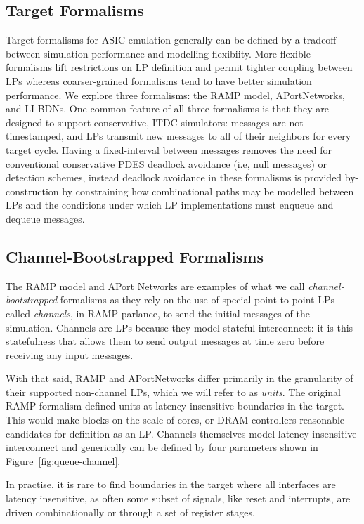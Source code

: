 \subsection{Target Formalisms}

Target formalisms for ASIC emulation generally can be defined by a tradeoff
between simulation performance and modelling flexibiity. More flexible
formalisms lift restrictions on LP definition and permit tighter coupling
between LPs whereas coarser-grained formalisms tend
to have better simulation performance. We explore three
formalisms: the RAMP model, APortNetworks, and LI-BDNs. One common feature of
all three formalisms is that they are designed to support conservative, ITDC
simulators: messages are not timestamped, and LPs transmit new messages to all
of their neighbors for every target cycle. Having a fixed-interval between
messages removes the need for conventional conservative PDES deadlock avoidance
(i.e, null messages) or detection schemes, instead deadlock avoidance in these
formalisms is provided by-construction by constraining how combinational paths
may be modelled between LPs and the conditions under which LP implementations
must enqueue and dequeue messages.

\subsection{Channel-Bootstrapped Formalisms}

The RAMP model and APort Networks are examples of what we call
\emph{channel-bootstrapped} formalisms as they rely on the use of special
point-to-point LPs called \emph{channels}, in RAMP parlance, to send the
initial messages of the simulation. Channels are LPs because they
model stateful interconnect: it is this statefulness that allows them to send output
messages at time zero before receiving any input messages.

With that said, RAMP and APortNetworks differ primarily in the granularity of
their supported non-channel LPs, which we will refer to as \emph{units}. The
original RAMP formalism defined units at latency-insensitive boundaries in the
target. This would make blocks on the scale of cores, or DRAM controllers
reasonable candidates for definition as an LP. Channels themselves model
latency insensitive interconnect and generically can be defined by four
parameters shown in Figure~\ref{fig:queue-channel}.

In practise, it is rare to find boundaries in the target where all
interfaces are latency insensitive, as often some subset of signals, like reset
and interrupts, are driven combinationally or through a set of register stages.

